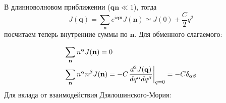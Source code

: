 \documentclass[a4paper,article,14pt]{extarticle}
\begin{document}
В длинноволновом приближении (${\mathbf{qn}} \ll 1$), тогда 
\[J({\mathbf{q}}) = \sum\limits_{\mathbf{n}} {{e^{i{\mathbf{qn}}}}J({\mathbf{n}})}  \simeq J(0) + \frac{C}{2}{q^2}\]
посчитаем теперь внутренние суммы по $\mathbf{n}$. Для обменного слагаемого:

\begin{eqnarray}
\label{eq:integrExch}
\begin{gathered}
  \sum\limits_{\mathbf{n}} {{n^\alpha }J({\mathbf{n}})}  = 0 \hfill \\
  \sum\limits_{\mathbf{n}} {{n^\alpha }{n^\beta }J({\mathbf{n}})}  =  - C{\left. {\frac{{{d^2}J({\mathbf{q}})}}{{d{q^\alpha }d{q^\beta }}}} \right|_{q = 0}} = - C{\delta _{\alpha \beta }} \hfill \\ 
\end{gathered}
\end{eqnarray}
Для вклада от взаимодействия Дзялошинского-Мория:
\end{document}
